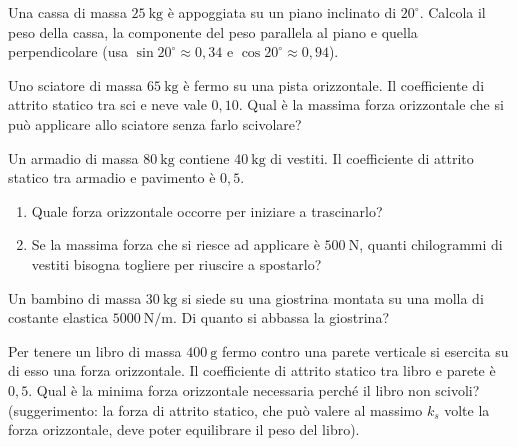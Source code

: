 \begin{esercizio}
Una cassa di massa $\SI{25}{\kilo\gram}$ è appoggiata su un piano inclinato di $20^\circ$. Calcola il peso della cassa, la componente del peso parallela al piano e quella perpendicolare (usa $\sin 20^\circ \approx 0,34$ e $\cos 20^\circ \approx 0,94$).\\
\end{esercizio}

\begin{esercizio}
Uno sciatore di massa $\SI{65}{\kilo\gram}$ è fermo su una pista orizzontale. Il coefficiente di attrito statico tra sci e neve vale $0,10$. Qual è la massima forza orizzontale che si può applicare allo sciatore senza farlo scivolare?\\
\end{esercizio}

\begin{esercizio}
Un armadio di massa $\SI{80}{\kilo\gram}$ contiene $\SI{40}{\kilo\gram}$ di vestiti. Il coefficiente di attrito statico tra armadio e pavimento è $0,5$.
\begin{enumerate}
\item[a)] Quale forza orizzontale occorre per iniziare a trascinarlo?
\item[b)] Se la massima forza che si riesce ad applicare è $\SI{500}{\newton}$, quanti chilogrammi di vestiti bisogna togliere per riuscire a spostarlo?
\end{enumerate}
\end{esercizio}

\begin{esercizio}
Un bambino di massa $\SI{30}{\kilo\gram}$ si siede su una giostrina montata su una molla di costante elastica $\SI{5000}{\newton\per\meter}$. Di quanto si abbassa la giostrina?\\
\end{esercizio}

\begin{esercizio}
Per tenere un libro di massa $\SI{400}{\gram}$ fermo contro una parete verticale si esercita su di esso una forza orizzontale. Il coefficiente di attrito statico tra libro e parete è $0,5$. Qual è la minima forza orizzontale necessaria perché il libro non scivoli? (suggerimento: la forza di attrito statico, che può valere al massimo $k_s$ volte la forza orizzontale, deve poter equilibrare il peso del libro).\\
\end{esercizio}


